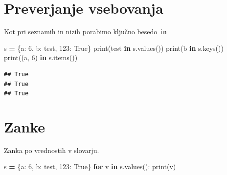 \documentclass[
]{book}
\newenvironment{Shaded}{\begin{snugshade}}{\end{snugshade}}
\newcommand{\BuiltInTok}[1]{#1}
\newcommand{\ControlFlowTok}[1]{\textcolor[rgb]{0.13,0.29,0.53}{\textbf{#1}}}
\newcommand{\DecValTok}[1]{\textcolor[rgb]{0.00,0.00,0.81}{#1}}
\newcommand{\KeywordTok}[1]{\textcolor[rgb]{0.13,0.29,0.53}{\textbf{#1}}}
\newcommand{\NormalTok}[1]{#1}
\newcommand{\OperatorTok}[1]{\textcolor[rgb]{0.81,0.36,0.00}{\textbf{#1}}}
\newcommand{\StringTok}[1]{\textcolor[rgb]{0.31,0.60,0.02}{#1}}
\newcommand{\VariableTok}[1]{\textcolor[rgb]{0.00,0.00,0.00}{#1}}
\begin{document}
\hypertarget{preverjanje-vsebovanja}{%
\section{Preverjanje vsebovanja}\label{preverjanje-vsebovanja}}

Kot pri seznamih in nizih porabimo ključno besedo \texttt{in}

\begin{Shaded}
\begin{Highlighting}[]
\NormalTok{s }\OperatorTok{=}\NormalTok{ \{}\StringTok{\textquotesingle{}a\textquotesingle{}}\NormalTok{: }\DecValTok{6}\NormalTok{, }\StringTok{\textquotesingle{}b\textquotesingle{}}\NormalTok{: }\StringTok{\textquotesingle{}test\textquotesingle{}}\NormalTok{, }\DecValTok{123}\NormalTok{: }\VariableTok{True}\NormalTok{\}}
\BuiltInTok{print}\NormalTok{(}\StringTok{\textquotesingle{}test\textquotesingle{}} \KeywordTok{in}\NormalTok{ s.values())}
\BuiltInTok{print}\NormalTok{(}\StringTok{\textquotesingle{}b\textquotesingle{}} \KeywordTok{in}\NormalTok{ s.keys())}
\BuiltInTok{print}\NormalTok{((}\StringTok{\textquotesingle{}a\textquotesingle{}}\NormalTok{, }\DecValTok{6}\NormalTok{) }\KeywordTok{in}\NormalTok{ s.items())}
\end{Highlighting}
\end{Shaded}

\begin{verbatim}
## True
## True
## True
\end{verbatim}

\hypertarget{zanke-1}{%
\section{Zanke}\label{zanke-1}}

Zanka po vrednostih v slovarju.

\begin{Shaded}
\begin{Highlighting}[]
\NormalTok{s }\OperatorTok{=}\NormalTok{ \{}\StringTok{\textquotesingle{}a\textquotesingle{}}\NormalTok{: }\DecValTok{6}\NormalTok{, }\StringTok{\textquotesingle{}b\textquotesingle{}}\NormalTok{: }\StringTok{\textquotesingle{}test\textquotesingle{}}\NormalTok{, }\DecValTok{123}\NormalTok{: }\VariableTok{True}\NormalTok{\}}
\ControlFlowTok{for}\NormalTok{ v }\KeywordTok{in}\NormalTok{ s.values():}
    \BuiltInTok{print}\NormalTok{(v)}
\end{Highlighting}
\end{Shaded}
\end{document}
